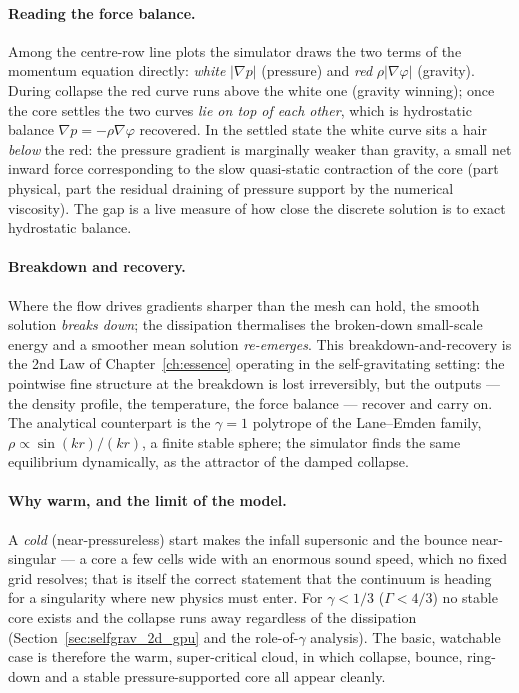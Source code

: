 \paragraph{Reading the force balance.}
Among the centre-row line plots the simulator draws the two terms of the
momentum equation directly: \emph{white} $|\nabla p|$ (pressure) and \emph{red}
$\rho|\nabla\varphi|$ (gravity). During collapse the red curve runs above the
white one (gravity winning); once the core settles the two curves \emph{lie on
top of each other}, which is hydrostatic balance $\nabla p = -\rho\nabla\varphi$
recovered. In the settled state the white curve sits a hair \emph{below} the
red: the pressure gradient is marginally weaker than gravity, a small net inward
force corresponding to the slow quasi-static contraction of the core (part
physical, part the residual draining of pressure support by the numerical
viscosity). The gap is a live measure of how close the discrete solution is to
exact hydrostatic balance.

\paragraph{Breakdown and recovery.}
Where the flow drives gradients sharper than the mesh can hold, the smooth
solution \emph{breaks down}; the dissipation thermalises the broken-down
small-scale energy and a smoother mean solution \emph{re-emerges}. This
breakdown-and-recovery is the 2nd Law of Chapter~\ref{ch:essence} operating in
the self-gravitating setting: the pointwise fine structure at the breakdown is
lost irreversibly, but the outputs --- the density profile, the temperature, the
force balance --- recover and carry on. The analytical counterpart is the
$\gamma = 1$ polytrope of the Lane--Emden family, $\rho \propto \sin(kr)/(kr)$,
a finite stable sphere; the simulator finds the same equilibrium dynamically,
as the attractor of the damped collapse.

\paragraph{Why warm, and the limit of the model.}
A \emph{cold} (near-pressureless) start makes the infall supersonic and the
bounce near-singular --- a core a few cells wide with an enormous sound speed,
which no fixed grid resolves; that is itself the correct statement that the
continuum is heading for a singularity where new physics must enter. For
$\gamma < 1/3$ ($\Gamma < 4/3$) no stable core exists and the collapse runs away
regardless of the dissipation (Section~\ref{sec:selfgrav_2d_gpu} and the
role-of-$\gamma$ analysis). The basic, watchable case is therefore the warm,
super-critical cloud, in which collapse, bounce, ring-down and a stable
pressure-supported core all appear cleanly.

